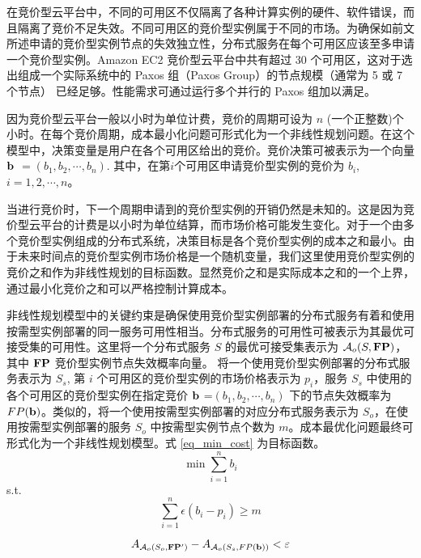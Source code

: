 在竞价型云平台中，不同的可用区不仅隔离了各种计算实例的硬件、软件错误，而且隔离了竞价不足失效。不同可用区的竞价型实例属于不同的市场。为确保如前文所述申请的竞价型实例节点的失效独立性，分布式服务在每个可用区应该至多申请一个竞价型实例。Amazon EC2 竞价型云平台中共有超过 30 个可用区，这对于选出组成一个实际系统中的 Paxos 组（Paxos Group）的节点规模（通常为 5 或 7 个节点）\cite{Burrows:2006:CLS:1298455.1298487} 已经足够。性能需求可通过运行多个并行的 Paxos 组加以满足。

因为竞价型云平台一般以小时为单位计费，竞价的周期可设为 $n$ (一个正整数)个小时。在每个竞价周期，成本最小化问题可形式化为一个非线性规划问题。在这个模型中，决策变量是用户在各个可用区给出的竞价。竞价决策可被表示为一个向量 $\bf b$ $= (b_1, b_2, \cdots, b_n)$. 其中，在第$i$个可用区申请竞价型实例的竞价为 $b_i$, $i = 1, 2, \cdots, n$。

当进行竞价时，下一个周期申请到的竞价型实例的开销仍然是未知的。这是因为竞价型云平台的计费是以小时为单位结算，而市场价格可能发生变化。对于一个由多个竞价型实例组成的分布式系统，决策目标是各个竞价型实例的成本之和最小。由于未来时间点的竞价型实例市场价格是一个随机变量，我们这里使用竞价型实例的竞价之和作为非线性规划的目标函数。显然竞价之和是实际成本之和的一个上界，通过最小化竞价之和可以严格控制计算成本。

非线性规划模型中的关键约束是确保使用竞价型实例部署的分布式服务有着和使用按需型实例部署的同一服务可用性相当。分布式服务的可用性可被表示为其最优可接受集的可用性。这里将一个分布式服务 $S$ 的最优可接受集表示为 $\mathcal{A}_{o}(S, \bf{FP})$，其中 $\bf{FP}$ 竞价型实例节点失效概率向量。 将一个使用竞价型实例部署的分布式服务表示为 $S_s$, 第 $i$ 个可用区的竞价型实例的市场价格表示为 $p_i$，服务 $S_s$ 中使用的各个可用区的竞价型实例在指定竞价 $\bf b$ =$ (b_1, b_2, \cdots, b_n)$ 下的节点失效概率为 $FP(\bf b)$。类似的，将一个使用按需型实例部署的对应分布式服务表示为 $S_o$，在使用按需型实例部署的服务 $S_o$ 中按需型实例节点个数为 $m$。成本最优化问题最终可形式化为一个非线性规划模型。式 \eqref{eq_min_cost} 为目标函数。
\begin{equation}\label{eq_min_cost}
\min \sum_{i=1}^n b_i
\end{equation}
s.t.
\begin{equation}\label{eq_bgp}
\sum_{i=1}^n {\epsilon(b_i - p_i)} \geq m
\end{equation}

\begin{equation}\label{eq_aae}
A_{\mathcal{A}_{o}(S_o, {\bf{FP^{\prime}}})} - A_{\mathcal{A}_{o}(S_s, FP(\bf b))} < \varepsilon
\end{equation}

